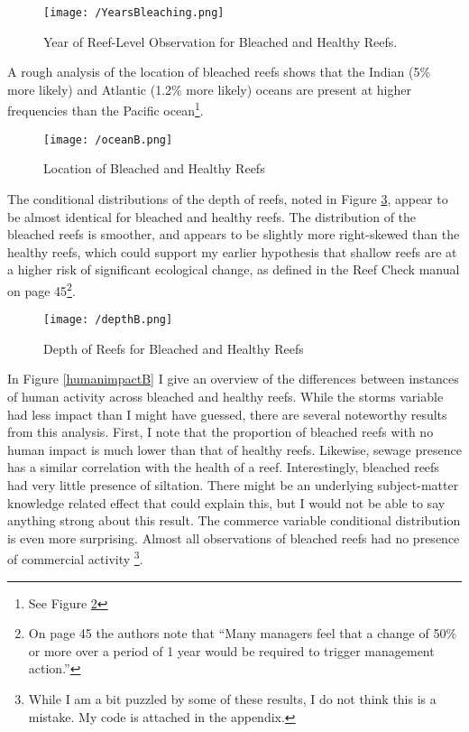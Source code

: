 \documentclass{article}
\begin{document}
\begin{figure}[!htb]
    \centering
    \texttt{[image: /YearsBleaching.png]}
    \caption{Year of Reef-Level Observation for Bleached and Healthy Reefs.}
    \label{yearB}
\end{figure}

A rough analysis of the location of bleached reefs shows that the Indian (5\% more likely) and Atlantic (1.2\% more likely) oceans are present at higher frequencies than the Pacific ocean\footnote{See Figure \ref{oceanB}}. \\

\newpage 

\begin{figure}[!htb]
    \centering
    \texttt{[image: /oceanB.png]}
    \caption{Location of Bleached and Healthy Reefs}
    \label{oceanB}
\end{figure}

The conditional distributions of the depth of reefs, noted in Figure \ref{depthB}, appear to be almost identical for bleached and healthy reefs. The distribution of the bleached reefs is smoother, and appears to be slightly more right-skewed than the healthy reefs, which could support my earlier hypothesis that shallow reefs are at a higher risk of significant ecological change, as defined in the Reef Check manual on page 45\footnote{On page 45 the authors note that ``Many managers feel that a change of 50\% or more over a period of 1
year would be required to trigger management action.''}.\\

\begin{figure}[!htb]
    \centering
    \texttt{[image: /depthB.png]}
    \caption{Depth of Reefs for Bleached and Healthy Reefs}
    \label{depthB}
\end{figure}

In Figure \ref{humanimpactB} I give an overview of the differences between instances of human activity across bleached and healthy reefs. While the storms variable had less impact than I might have guessed, there are several noteworthy results from this analysis. First, I note that the proportion of bleached reefs with no human impact is much lower than that of healthy reefs. Likewise, sewage presence has a similar correlation with the health of a reef. Interestingly, bleached reefs had very little presence of siltation. There might be an underlying subject-matter knowledge related effect that could explain this, but I would not be able to say anything strong about this result. The commerce variable conditional distribution is even more surprising. Almost all observations of bleached reefs had no presence of commercial activity \footnote{While I am a bit puzzled by some of these results, I do not think this is a mistake. My code is attached in the appendix.}. 
\end{document}

